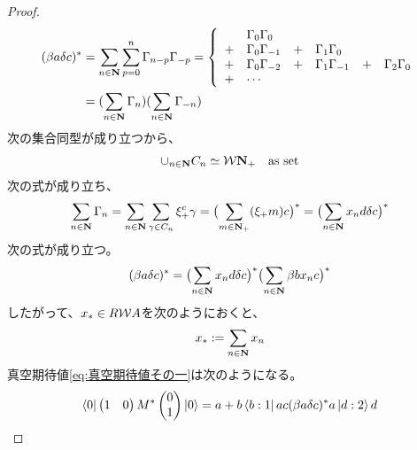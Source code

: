 {\begin{proof}
\begin{equation*}
\begin{split}
			(\beta a\delta c)^* 
			&= \sum_{n\in\mathbf{N}} \sum_{p=0}^n \Gamma_{n-p}\Gamma_{-p}
			= \left\{\begin{array}{clclclcl}
				& \Gamma_0\Gamma_0 \\
				+ & \Gamma_0\Gamma_{-1} &+& \Gamma_1\Gamma_0 \\
				+ & \Gamma_0\Gamma_{-2} &+& \Gamma_1\Gamma_{-1} &+& \Gamma_2\Gamma_{0} \\
				+ & \cdots
			\end{array}\right. \\
			&= (\sum_{n\in\mathbf{N}}\Gamma_n)(\sum_{n\in\mathbf{N}}\Gamma_{-n}) \\
		\end{split}\end{equation*}
		次の集合同型が成り立つから、
		\begin{equation*}\begin{split}
			\cup_{n\in\mathbf{N}}C_n \simeq {\ensuremath{{\mathcal{W}}}}\mathbf{N}_+ \quad\text{as set}
		\end{split}\end{equation*}
		次の式が成り立ち、
		\begin{equation*}\begin{split}
			\sum_{n\in\mathbf{N}}\Gamma_n
			= \sum_{n\in\mathbf{N}}\sum_{\gamma\in C_n} \xi_+^c\gamma
			= \bigl(\sum_{m\in\mathbf{N}_+}(\xi_+m)c\bigr)^*
			= \bigl(\sum_{n\in\mathbf{N}}x_nd\delta c\bigr)^*
		\end{split}\end{equation*}
		次の式が成り立つ。
		\begin{equation*}\begin{split}
			(\beta a\delta c)^* = \bigl(\sum_{n\in\mathbf{N}}x_nd\delta c\bigr)^*
				\bigl(\sum_{n\in\mathbf{N}}\beta bx_nc\bigr)^*
		\end{split}\end{equation*}
		したがって、$x_*\in R{{\mathcal{W}}} A$を次のようにおくと、
		\begin{equation*}\begin{split}
			x_* := \sum_{n\in\mathbf{N}} x_n
		\end{split}\end{equation*}
		真空期待値\eqref{eq:真空期待値その一}は次のようになる。
		\begin{equation*}\begin{split}
			\bra{0}\begin{pmatrix}
				1 & 0
			\end{pmatrix}M^*\begin{pmatrix}
				0 \\ 1
			\end{pmatrix}\ket{0} &= a + b\bra{b:1}ac(\beta a\delta c)^*a\ket{d:2}d \\

\end{split}
\end{equation*}
\end{proof}}
